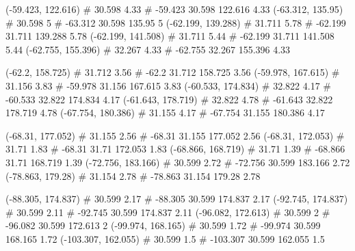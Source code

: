 \documentclass[a4paper,openbib,10pt]{article}
\newenvironment{treegraph}{\begin{graph}}{\end{graph}}
\begin{document}
\begin{treegraph}
  (-59.423, 122.616) #     30.598    4.33
   #    -59.423    30.598    122.616    4.33
  (-63.312, 135.95) #     30.598    5
   #    -63.312    30.598    135.95    5
  (-62.199, 139.288) #     31.711    5.78
   #    -62.199    31.711    139.288    5.78
  (-62.199, 141.508) #     31.711    5.44
   #    -62.199    31.711    141.508    5.44
  (-62.755, 155.396) #     32.267    4.33
   #    -62.755    32.267    155.396    4.33

  (-62.2, 158.725) #     31.712    3.56
   #    -62.2    31.712    158.725    3.56
  (-59.978, 167.615) #     31.156    3.83
   #    -59.978    31.156    167.615    3.83
  (-60.533, 174.834) #     32.822    4.17
   #    -60.533    32.822    174.834    4.17
  (-61.643, 178.719) #     32.822    4.78
   #    -61.643    32.822    178.719    4.78
  (-67.754, 180.386) #     31.155    4.17
   #    -67.754    31.155    180.386    4.17

  (-68.31, 177.052) #     31.155    2.56
   #    -68.31    31.155    177.052    2.56
  (-68.31, 172.053) #     31.71    1.83
   #    -68.31    31.71    172.053    1.83
  (-68.866, 168.719) #     31.71    1.39
   #    -68.866    31.71    168.719    1.39
  (-72.756, 183.166) #     30.599    2.72
   #    -72.756    30.599    183.166    2.72
  (-78.863, 179.28) #     31.154    2.78
   #    -78.863    31.154    179.28    2.78

  (-88.305, 174.837) #     30.599    2.17
   #    -88.305    30.599    174.837    2.17
  (-92.745, 174.837) #     30.599    2.11
   #    -92.745    30.599    174.837    2.11
  (-96.082, 172.613) #     30.599    2
   #    -96.082    30.599    172.613    2
  (-99.974, 168.165) #     30.599    1.72
   #    -99.974    30.599    168.165    1.72
  (-103.307, 162.055) #     30.599    1.5
   #    -103.307    30.599    162.055    1.5


\end{treegraph}
\end{document}
